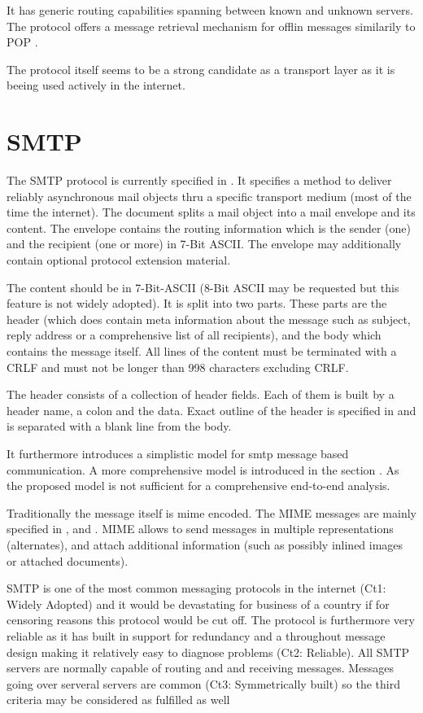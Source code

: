 \documentclass[a4paper,appendixprefix,pdfusetitle,twocolumn,fontsize=8pt,attachdocs,draft,status=draft]{scrbook}
\begin{document}
It has generic routing capabilities spanning between known and unknown servers. The protocol offers a message retrieval mechanism for offlin messages similarily to POP \cite{xep0013}.

The protocol itself seems to be a strong candidate as a transport layer as it is beeing used actively in the internet.

\section{SMTP}
The SMTP protocol is currently specified in \cite{RFC5321}. It specifies a method to deliver reliably asynchronous mail objects thru a specific transport medium (most of the time the internet). The document splits a mail object into a mail envelope and its content. The envelope contains the routing information which is the sender (one) and the recipient (one or more) in 7-Bit ASCII. The envelope may additionally contain optional protocol extension material. \par

The content should be in 7-Bit-ASCII (8-Bit ASCII may be requested but this feature is not widely adopted). It is split into two parts. These parts are the header (which does contain meta information about the message such as subject, reply address or a comprehensive list of all recipients), and the body which contains the message itself. All lines of the content must be terminated with a CRLF and must not be longer than 998 characters excluding CRLF.\par

The header consists of a collection of header fields. Each of them is built by a header name, a colon and the data. Exact outline of the header is specified in \cite{RFC5322} and is separated with a blank line from the body. 

It \cite{RFC5321} furthermore introduces a simplistic model for smtp message based communication. A more comprehensive model is introduced in the section . As the proposed model is not sufficient for a comprehensive end-to-end analysis.\par

Traditionally the message itself is mime encoded. The MIME messages are mainly specified in \cite{RFC2045}, and \cite{RFC2046}. MIME allows to send messages in multiple representations (alternates), and attach additional information (such as possibly inlined images or attached documents). 

SMTP is one of the most common messaging protocols in the internet (Ct1: Widely Adopted) and it would be devastating for business of a country if for censoring reasons this protocol would be cut off. The protocol is furthermore very reliable as it has built in support for redundancy and a throughout message design making it relatively easy to diagnose problems (Ct2: Reliable). All SMTP servers are normally capable of routing and and receiving messages. Messages going over serveral servers are common (Ct3: Symmetrically built) so the third criteria may be considered as fulfilled as well
\end{document}
